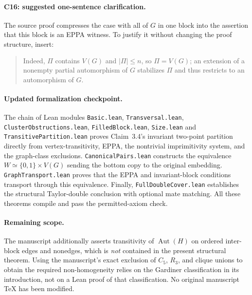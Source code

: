 \documentclass[11pt]{article}
\begin{document}
\paragraph{C16: suggested one-sentence clarification.}
The source proof compresses the case with all of
\(G\) in one block into the assertion that
this block is an EPPA witness. To justify it
without changing the proof structure, insert:
\begin{quote}
Indeed, \(\Pi\) contains \(V(G)\) and
\(|\Pi|\le n\), so \(\Pi=V(G)\);
an extension of a nonempty partial automorphism
of \(G\) stabilizes \(\Pi\) and thus restricts
to an automorphism of \(G\).
\end{quote}
\paragraph{Updated formalization checkpoint.}
The chain of Lean modules
\texttt{Basic.lean},
\texttt{Transversal.lean},
\texttt{ClusterObstructions.lean},
\texttt{FilledBlock.lean},
\texttt{Size.lean} and
\texttt{TransitivePartition.lean}
proves Claim~3.4's invariant two-point partition
directly from vertex-transitivity, EPPA,
the nontrivial imprimitivity system, and
the graph-class exclusions.
\texttt{CanonicalPairs.lean}
constructs the equivalence
\(W\simeq\{0,1\}\times V(G)\) sending
the bottom copy to the original embedding.
\texttt{GraphTransport.lean} proves
that the EPPA and invariant-block conditions
transport through this equivalence.
Finally,
\texttt{FullDoubleCover.lean}
establishes the structural Taylor-double
conclusion with optional mate matching.
All these theorems compile and pass the
permitted-axiom check.

\paragraph{Remaining scope.}
The manuscript additionally asserts transitivity
of \(\operatorname{Aut}(H)\) on ordered inter-block
edges and nonedges, which is \emph{not}
contained in the present structural theorem.
Using the manuscript's exact exclusion of
\(C_5\), \(R_3\), and clique unions to obtain
the required non-homogeneity relies on
the Gardiner classification in its introduction,
not on a Lean proof of that classification.
No original manuscript TeX has been modified.
\end{document}
